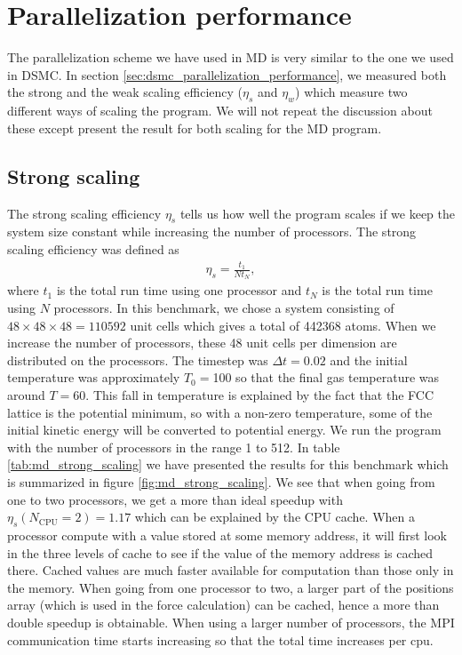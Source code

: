 \section{Parallelization performance}
The parallelization scheme we have used in MD is very similar to the one we used in DSMC. In section \ref{sec:dsmc_parallelization_performance}, we measured both the strong and the weak scaling efficiency ($\eta_s$ and $\eta_w$) which measure two different ways of scaling the program. We will not repeat the discussion about these except present the result for both scaling for the MD program. 

\subsection{Strong scaling}
The strong scaling efficiency $\eta_s$ tells us how well the program scales if we keep the system size constant while increasing the number of processors. The strong scaling efficiency was defined as
\begin{align}
	\eta_s = \frac{t_1}{Nt_N},
\end{align}
where $t_1$ is the total run time using one processor and $t_N$ is the total run time using $N$ processors. In this benchmark, we chose a system consisting of $48\times48\times48=110592$ unit cells which gives a total of 442368 atoms. When we increase the number of processors, these 48 unit cells per dimension are distributed on the processors. The timestep was $\Delta t = 0.02$ and the initial temperature was approximately $T_0=$\unit{100}{\kelvin} so that the final gas temperature was around $T=$\unit{60}{\kelvin}. This fall in temperature is explained by the fact that the FCC lattice is the potential minimum, so with a non-zero temperature, some of the initial kinetic energy will be converted to potential energy. We run the program with the number of processors in the range 1 to 512. In table \ref{tab:md_strong_scaling} we have presented the results for this benchmark which is summarized in figure \ref{fig:md_strong_scaling}. We see that when going from one to two processors, we get a more than ideal speedup with $\eta_s(N_\text{CPU}=2)=1.17$ which can be explained by the CPU cache. When a processor compute with a value stored at some memory address, it will first look in the three levels of cache to see if the value of the memory address is cached there. Cached values are much faster available for computation than those only in the memory. When going from one processor to two, a larger part of the positions array (which is used in the force calculation) can be cached, hence a more than double speedup is obtainable. When using a larger number of processors, the MPI communication time starts increasing so that the total time increases per cpu. 

